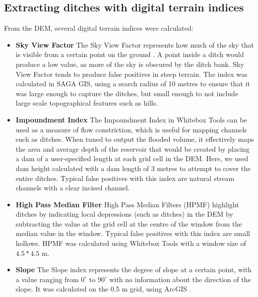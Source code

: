 \documentclass[11pt, review]{elsarticle} %
\begin{document}
\subsection{Extracting ditches with digital terrain indices}
From the DEM, several digital terrain indices were calculated:
\begin{itemize} \label{data_attributes}

  \item \textbf{Sky View Factor} \label{skyviewfactor} \newline
    The Sky View Factor represents how much of the sky that is visible from a certain point on the ground \citep{zaksek}. A point inside a ditch would produce a low value, as more of the sky is obscured by the ditch bank. Sky View Factor tends to produce false positives in steep terrain. The index was calculated in SAGA GIS, using a search radius of 10 metres to ensure that it was large enough to capture the ditches, but small enough to not include large scale topographical features such as hills.

  \item \textbf{Impoundment Index} \label{impoundment} \newline
    The Impoundment Index in Whitebox Tools \citep{whiteboxtools} can be used as a measure of flow constriction, which is useful for mapping channels such as ditches. When tuned to output the flooded volume, it effectively maps the area and average depth of the reservoir that would be created by placing a dam of a user-specified length at each grid cell in the DEM. Here, we used dam height calculated with a dam length of 3 metres to attempt to cover the entire ditches. Typical false positives with this index are natural stream channels with a clear incised channel.
  
  \item \textbf{High Pass Median Filter} \label{hpmf} \newline
    High Pass Median Filters (HPMF) highlight ditches by indicating local depressions (such as ditches) in the DEM by subtracting the value at the grid cell at the centre of the window from the median value in the window. Typical false positives with this index are small hollows. HPMF was calculated using Whitebox Tools \citep{whiteboxtools} with a window size of $4.5 * 4.5$ m. 

    \item \textbf{Slope} \label{slope} \newline
    The Slope index represents the degree of slope at a certain point, with a value ranging from $0^{\circ}$ to $90^{\circ}$ with no information about the direction of the slope. It was calculated on the 0.5 m grid, using ArcGIS \citep{EsriArcGisBook}.
\end{itemize}
\end{document}

